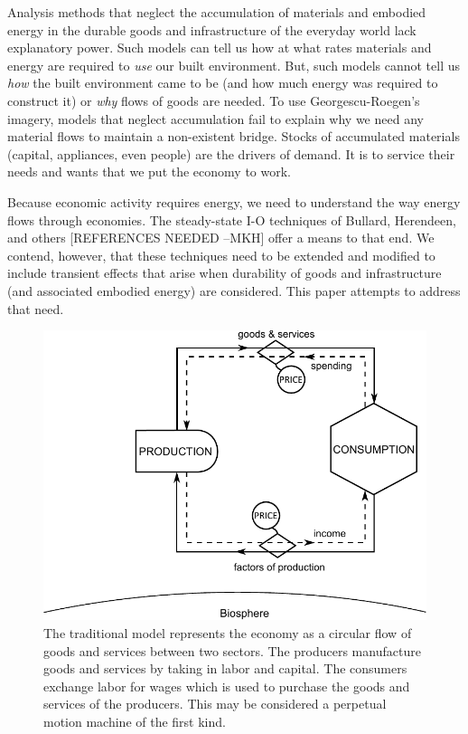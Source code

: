 Analysis methods that neglect the accumulation of materials and embodied energy in the durable goods and infrastructure of the everyday world lack explanatory power. Such models can tell us how at what rates materials and energy are required to \emph{use} our built environment. But, such models cannot tell us \emph{how} the built environment came to be (and how much energy was required to construct it) or \emph{why} flows of goods are needed. To use Georgescu-Roegen's imagery, models that neglect accumulation fail to explain why we need any material flows to maintain a non-existent bridge. Stocks of accumulated materials (capital, appliances, even people) are the drivers of demand. It is to service their needs and wants that we put the economy to work. %

Because economic activity requires energy, we need to understand the way energy flows through economies. The steady-state I-O techniques of Bullard, Herendeen, and others\cite{Bullard1975,Herendeen1978} [REFERENCES NEEDED --MKH] offer a means to that end. We contend, however, that these techniques need to be extended and modified to include transient effects that arise when durability of goods and infrastructure (and associated embodied energy) are considered. This paper attempts to address that need.

\begin{figure}[!ht]
\centering{}
\includegraphics[width=\linewidth]{Part_0/Chapter_Introduction/images/Perpetual_motion_1.pdf}
\caption[The traditional economic model of the economy]{The traditional model represents the economy as a circular flow of goods and services between two sectors. The producers manufacture goods and services by taking in labor and capital. The consumers exchange labor for wages which is used to purchase the goods and services of the producers. This may be considered a perpetual motion machine of the first kind.}
\end{figure}

